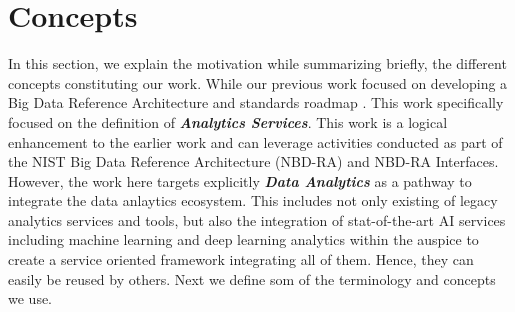 

\section{Concepts}\label{s:background}

In this section, we explain the motivation while summarizing briefly,
the different concepts constituting our work. While our previous work
focused on developing a Big Data Reference Architecture and standards
roadmap \cite{nist-v8}. This work specifically focused on the
definition of {\bf\em Analytics Services}.  This work is a logical
enhancement to the earlier work and can leverage activities conducted
as part of the NIST Big Data Reference Architecture (NBD-RA) and
NBD-RA Interfaces.  However, the work here targets explicitly {\bf\em
Data Analytics} as a pathway to integrate the data anlaytics
ecosystem. This includes not only existing of legacy analytics
services and tools, but also the integration of stat-of-the-art AI
services including machine learning and deep learning analytics within
the auspice to create a service oriented framework integrating all of
them. Hence, they can easily be reused by others. Next we define som
of the terminology and concepts we use.


